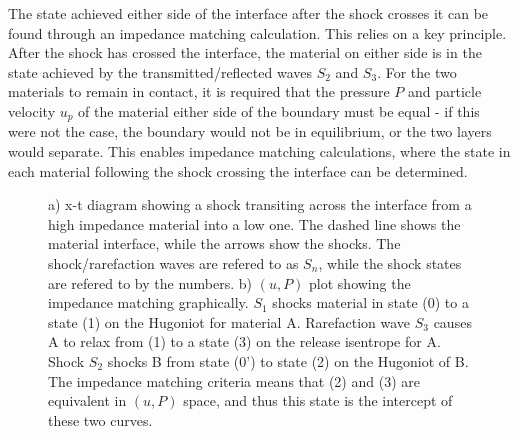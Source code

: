 The state achieved either side of the interface after the shock crosses it can be found through an impedance matching calculation. This relies on a key principle. After the shock has crossed the interface, the material on either side is in the state achieved by the transmitted/reflected waves $S_2$ and $S_3$. For the two materials to remain in contact, it is required that the pressure $P$ and particle velocity $u_p$ of the material either side of the boundary must be equal - if this were not the case, the boundary would not be in equilibrium, or the two layers would separate. This enables impedance matching calculations, where the state in each material following the shock crossing the interface can be determined.

\begin{figure}
\centering     %
{}
\caption{ \label{fig:ShockDiagramAndIMTheory1} a) x-t diagram showing a shock transiting across the interface from a high impedance material into a low one. The dashed line shows the material interface, while the arrows show the shocks. The shock/rarefaction waves are refered to as $S_n$, while the shock states are refered to by the numbers. b) $(u, P)$ plot showing the impedance matching graphically. $S_1$ shocks material in state (0) to a state (1) on the Hugoniot for material A. Rarefaction wave $S_3$ causes A to relax from (1) to a state (3) on the release isentrope for A. Shock $S_2$ shocks B from state (0') to state (2) on the Hugoniot of B. The impedance matching criteria means that (2) and (3) are equivalent in $(u, P)$ space, and thus this state is the intercept of these two curves.}
\end{figure}

